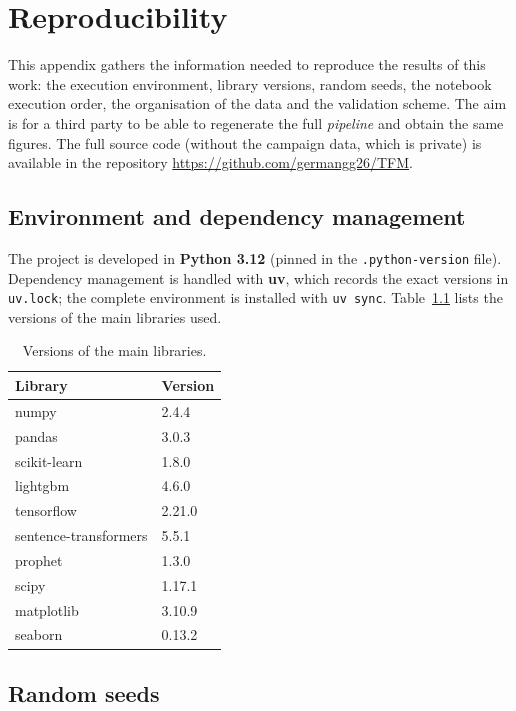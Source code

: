 \chapter{Reproducibility}
\label{ap:reproducibilidad}

This appendix gathers the information needed to reproduce the results of this work: the execution environment, library versions, random seeds, the notebook execution order, the organisation of the data and the validation scheme. The aim is for a third party to be able to regenerate the full \textit{pipeline} and obtain the same figures. The full source code (without the campaign data, which is private) is available in the repository \url{https://github.com/germangg26/TFM}.

\section{Environment and dependency management}

The project is developed in \textbf{Python 3.12} (pinned in the \texttt{.python-version} file). Dependency management is handled with \textbf{uv}, which records the exact versions in \texttt{uv.lock}; the complete environment is installed with \texttt{uv sync}. Table~\ref{tab:versiones} lists the versions of the main libraries used.

\begin{table}[htbp]
\centering
\caption{Versions of the main libraries.}
\label{tab:versiones}
\begin{tabular}{ll}
\toprule
\textbf{Library} & \textbf{Version} \\
\midrule
numpy                 & 2.4.4 \\
pandas                & 3.0.3 \\
scikit-learn          & 1.8.0 \\
lightgbm              & 4.6.0 \\
tensorflow            & 2.21.0 \\
sentence-transformers & 5.5.1 \\
prophet               & 1.3.0 \\
scipy                 & 1.17.1 \\
matplotlib            & 3.10.9 \\
seaborn               & 0.13.2 \\
\bottomrule
\end{tabular}
\end{table}

\section{Random seeds}

